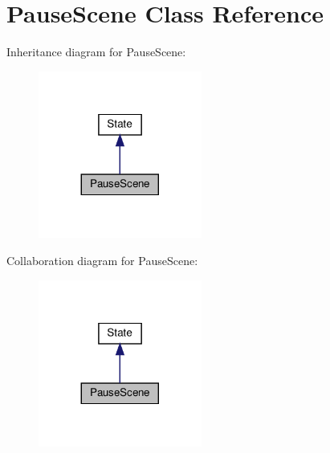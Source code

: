 \hypertarget{classPauseScene}{}\section{Pause\+Scene Class Reference}
\label{classPauseScene}


Inheritance diagram for Pause\+Scene\+:
\nopagebreak
\begin{figure}[H]
\begin{center}
\leavevmode
\includegraphics[width=152pt]{classPauseScene__inherit__graph}
\end{center}
\end{figure}


Collaboration diagram for Pause\+Scene\+:
\nopagebreak
\begin{figure}[H]
\begin{center}
\leavevmode
\includegraphics[width=152pt]{classPauseScene__coll__graph}
\end{center}
\end{figure}
